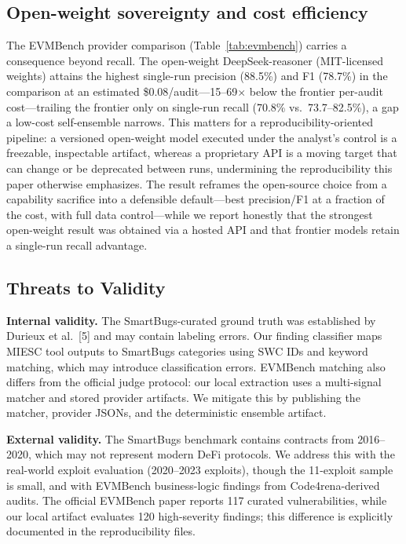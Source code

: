 \documentclass[conference]{IEEEtran}
\begin{document}
\subsection{Open-weight sovereignty and cost efficiency}

The EVMBench provider comparison (Table~\ref{tab:evmbench}) carries a consequence beyond recall. The open-weight DeepSeek-reasoner (MIT-licensed weights) attains the highest single-run precision (88.5\%) and F1 (78.7\%) in the comparison at an estimated \$0.08/audit---15--69$\times$ below the frontier per-audit cost---trailing the frontier only on single-run recall (70.8\% vs.\ 73.7--82.5\%), a gap a low-cost self-ensemble narrows. This matters for a reproducibility-oriented pipeline: a versioned open-weight model executed under the analyst's control is a freezable, inspectable artifact, whereas a proprietary API is a moving target that can change or be deprecated between runs, undermining the reproducibility this paper otherwise emphasizes. The result reframes the open-source choice from a capability sacrifice into a defensible default---best precision/F1 at a fraction of the cost, with full data control---while we report honestly that the strongest open-weight result was obtained via a hosted API and that frontier models retain a single-run recall advantage.

\subsection{Threats to Validity}

\textbf{Internal validity.} The SmartBugs-curated ground truth was established by Durieux et al.~[5] and may contain labeling errors. Our finding classifier maps MIESC tool outputs to SmartBugs categories using SWC IDs and keyword matching, which may introduce classification errors. EVMBench matching also differs from the official judge protocol: our local extraction uses a multi-signal matcher and stored provider artifacts. We mitigate this by publishing the matcher, provider JSONs, and the deterministic ensemble artifact.

\textbf{External validity.} The SmartBugs benchmark contains contracts from 2016--2020, which may not represent modern DeFi protocols. We address this with the real-world exploit evaluation (2020--2023 exploits), though the 11-exploit sample is small, and with EVMBench business-logic findings from Code4rena-derived audits. The official EVMBench paper reports 117 curated vulnerabilities, while our local artifact evaluates 120 high-severity findings; this difference is explicitly documented in the reproducibility files.
\end{document}
